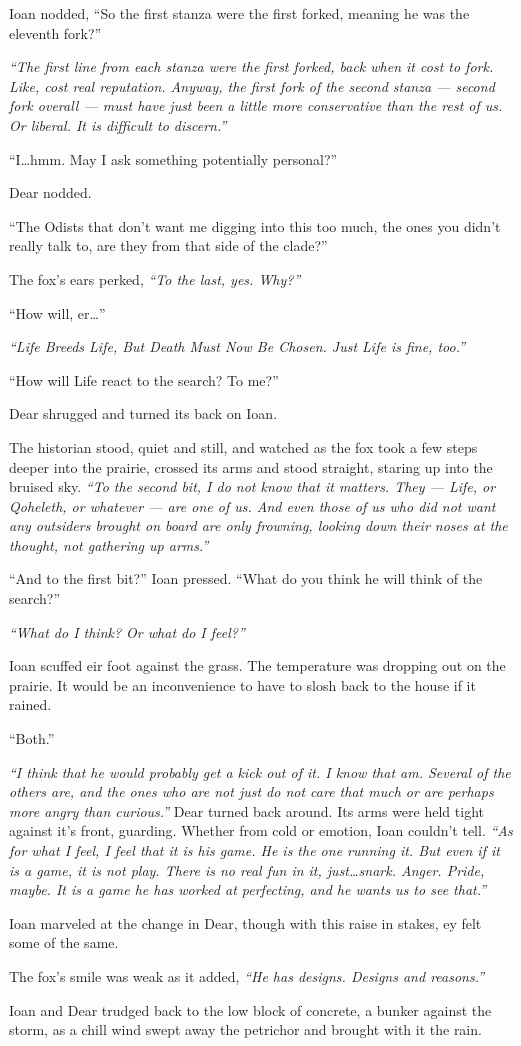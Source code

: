 Ioan nodded, ``So the first stanza were the first forked, meaning he was the eleventh fork?''

\emph{``The first line from each stanza were the first forked, back when it cost to fork. Like, cost real reputation. Anyway, the first fork of the second stanza — second fork overall — must have just been a little more conservative than the rest of us. Or liberal. It is difficult to discern.''}

``I\ldots{}hmm. May I ask something potentially personal?''

Dear nodded.

``The Odists that don't want me digging into this too much, the ones you didn't really talk to, are they from that side of the clade?''

The fox's ears perked, \emph{``To the last, yes. Why?''}

``How will, er\ldots{}''

\emph{``Life Breeds Life, But Death Must Now Be Chosen. Just Life is fine, too.''}

``How will Life react to the search? To me?''

Dear shrugged and turned its back on Ioan.

The historian stood, quiet and still, and watched as the fox took a few steps deeper into the prairie, crossed its arms and stood straight, staring up into the bruised sky. \emph{``To the second bit, I do not know that it matters. They — Life, or Qoheleth, or whatever — are one of us. And even those of us who did not want any outsiders brought on board are only frowning, looking down their noses at the thought, not gathering up arms.''}

``And to the first bit?'' Ioan pressed. ``What do you think he will think of the search?''

\emph{``What do I think? Or what do I feel?''}

Ioan scuffed eir foot against the grass. The temperature was dropping out on the prairie. It would be an inconvenience to have to slosh back to the house if it rained.

``Both.''

\emph{``I think that he would probably get a kick out of it. I know that am. Several of the others are, and the ones who are not just do not care that much or are perhaps more angry than curious.''} Dear turned back around. Its arms were held tight against it's front, guarding. Whether from cold or emotion, Ioan couldn't tell. \emph{``As for what I feel, I feel that it is his game. He is the one running it. But even if it is a game, it is not play. There is no real fun in it, just\ldots{}snark. Anger. Pride, maybe. It is a game he has worked at perfecting, and he wants us to see that.''}

Ioan marveled at the change in Dear, though with this raise in stakes, ey felt some of the same.

The fox's smile was weak as it added, \emph{``He has designs. Designs and reasons.''}

Ioan and Dear trudged back to the low block of concrete, a bunker against the storm, as a chill wind swept away the petrichor and brought with it the rain.
